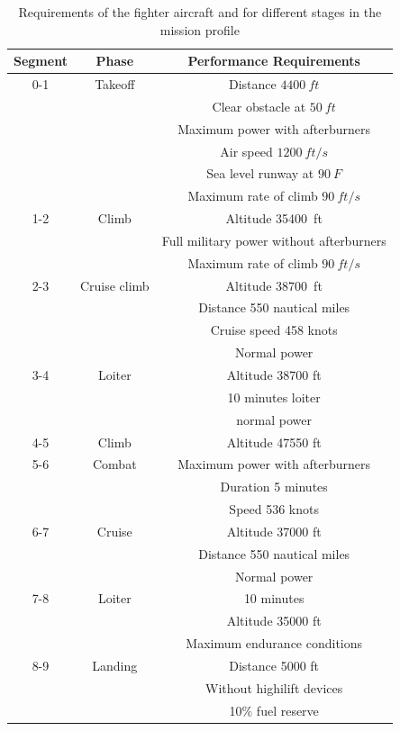 \documentclass[pdftex,11pt,letter]{article}
\begin{document}
\begin{table}[h]
\caption{Requirements of the fighter aircraft and for different stages in the mission profile}
\centering 
\begin{tabular}{c| c| c}
\hline\hline
{Segment} & Phase       & Performance Requirements \\
\hline\hline
0-1 	& Takeoff 	& Distance $4400~ft$ \\
	&		& Clear obstacle at $50~ft$\\
	& 		& Maximum power with afterburners\\
	& 		& Air speed $1200~ft/s$ \\
	&		& Sea level runway at $90~F$\\
	&		& Maximum rate of climb $90~ft/s$\\
\hline
1-2	& Climb		& Altitude 35400~ft \\
	& 		& Full military power without afterburners\\
	&		& Maximum rate of climb $90~ft/s$\\
\hline
2-3 	& Cruise climb	& Altitude 38700~ft \\
	&		& Distance 550 nautical miles \\
	&		& Cruise speed 458 knots\\
	&		& Normal power \\
\hline
3-4 	& Loiter	& Altitude 38700 ft\\
	&		& 10 minutes loiter \\
	& 		& normal power\\
\hline
4-5	& Climb		& Altitude 47550 ft\\
\hline
5-6	& Combat 	& Maximum power with afterburners \\
	&		& Duration 5 minutes \\
	& 		& Speed 536 knots \\
\hline
6-7	& Cruise 	& Altitude 37000 ft\\
	& 		& Distance 550 nautical miles\\
	&		& Normal power\\
\hline
7-8	& Loiter	& 10 minutes  \\	
	& 		& Altitude 35000 ft\\
	&		& Maximum endurance conditions \\
\hline
8-9	& Landing	& Distance 5000 ft \\
	&		& Without highilift devices\\	
	&		& 10$\%$ fuel reserve\\
\hline\hline
\end{tabular}
\label{tab:requirements}
\end{table}
\end{document}
